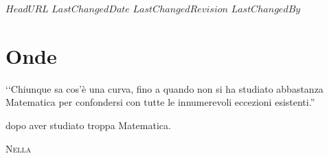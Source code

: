 \svnidlong
{$HeadURL$}
{$LastChangedDate$}
{$LastChangedRevision$}
{$LastChangedBy$}

\chapter{Onde}

\begin{introduction}
	‘‘Chiunque sa cos'è una curva, fino a quando non si ha studiato abbastanza Matematica per confondersi con tutte le innumerevoli eccezioni esistenti.''
	\begin{flushright}
		 dopo aver studiato troppa Matematica. %
	\end{flushright}
\end{introduction}
\lettrine[findent=1pt, nindent=0pt]{N}{ella} %









